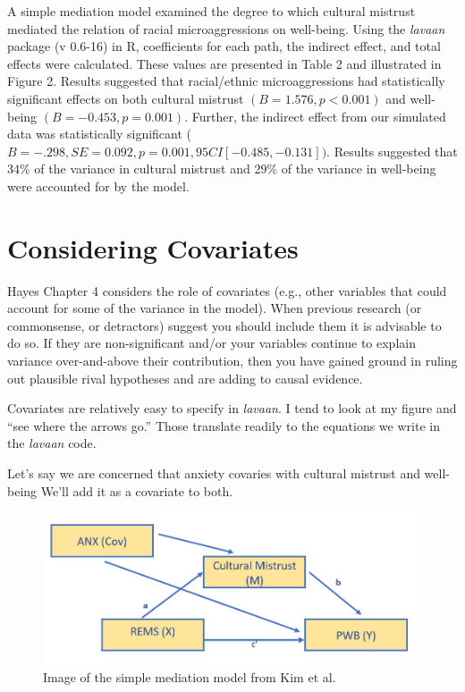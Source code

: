 \documentclass[
  11pt,
]{book}
\begin{document}
A simple mediation model examined the degree to which cultural mistrust mediated the relation of racial microaggressions on well-being. Using the \emph{lavaan} package (v 0.6-16) in R, coefficients for each path, the indirect effect, and total effects were calculated. These values are presented in Table 2 and illustrated in Figure 2. Results suggested that racial/ethnic microaggressions had statistically significant effects on both cultural mistrust \((B = 1.576, p < 0.001)\) and well-being \((B = -0.453, p = 0.001)\). Further, the indirect effect from our simulated data was statistically significant (\(B = -.298, SE = 0.092, p = 0.001, 95CI[-0.485,-0.131])\). Results suggested that 34\% of the variance in cultural mistrust and 29\% of the variance in well-being were accounted for by the model.

\hypertarget{considering-covariates}{%
\section{Considering Covariates}\label{considering-covariates}}

Hayes Chapter 4 \citeyearpar{hayes_introduction_2018} considers the role of covariates (e.g., other variables that could account for some of the variance in the model). When previous research (or commonsense, or detractors) suggest you should include them it is advisable to do so. If they are non-significant and/or your variables continue to explain variance over-and-above their contribution, then you have gained ground in ruling out plausible rival hypotheses and are adding to causal evidence.

Covariates are relatively easy to specify in \emph{lavaan}. I tend to look at my figure and ``see where the arrows go.'' Those translate readily to the equations we write in the \emph{lavaan} code.

Let's say we are concerned that anxiety covaries with cultural mistrust and well-being We'll add it as a covariate to both.

\begin{figure}
\centering
\includegraphics{images/SimpleMed/Kim_wCovs.jpg}
\caption{Image of the simple mediation model from Kim et al.}
\end{figure}
\end{document}

